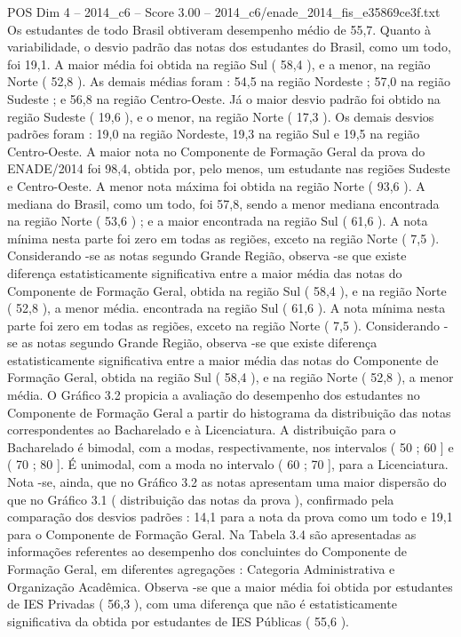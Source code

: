 \begin{textsample}{POS Dim 4 – 2014\_c6 – Score 3.00 – 2014\_c6/enade\_2014\_fis\_e35869ce3f.txt}
Os estudantes de todo Brasil obtiveram desempenho médio de 55,7.
Quanto à variabilidade, o desvio padrão das notas dos estudantes do Brasil, como um todo, foi 19,1.
A maior média foi obtida na região Sul ( 58,4 ), e a menor, na região Norte ( 52,8 ).
As demais médias foram : 54,5 na região Nordeste ; 57,0 na região Sudeste ; e 56,8 na região Centro-Oeste.
Já o maior desvio padrão foi obtido na região Sudeste ( 19,6 ), e o menor, na região Norte ( 17,3 ).
Os demais desvios padrões foram : 19,0 na região Nordeste, 19,3 na região Sul e 19,5 na região Centro-Oeste.
A maior nota no Componente de Formação Geral da prova do ENADE/2014 foi 98,4, obtida por, pelo menos, um estudante nas regiões Sudeste e Centro-Oeste.
A menor nota máxima foi obtida na região Norte ( 93,6 ).
A mediana do Brasil, como um todo, foi 57,8, sendo a menor mediana encontrada na região Norte ( 53,6 ) ; e a maior encontrada na região Sul ( 61,6 ).
A nota mínima nesta parte foi zero em todas as regiões, exceto na região Norte ( 7,5 ).
Considerando -se as notas segundo Grande Região, observa -se que existe diferença estatisticamente significativa entre a maior média das notas do Componente de Formação Geral, obtida na região Sul ( 58,4 ), e na região Norte ( 52,8 ), a menor média. encontrada na região Sul ( 61,6 ).
A nota mínima nesta parte foi zero em todas as regiões, exceto na região Norte ( 7,5 ).
Considerando -se as notas segundo Grande Região, observa -se que existe diferença estatisticamente significativa entre a maior média das notas do Componente de Formação Geral, obtida na região Sul ( 58,4 ), e na região Norte ( 52,8 ), a menor média.
O Gráfico 3.2 propicia a avaliação do desempenho dos estudantes no Componente de Formação Geral a partir do histograma da distribuição das notas correspondentes ao Bacharelado e à Licenciatura.
A distribuição para o Bacharelado é bimodal, com a modas, respectivamente, nos intervalos ( 50 ; 60 ] e ( 70 ; 80 ].
É unimodal, com a moda no intervalo ( 60 ; 70 ], para a Licenciatura.
Nota -se, ainda, que no Gráfico 3.2 as notas apresentam uma maior dispersão do que no Gráfico 3.1 ( distribuição das notas da prova ), confirmado pela comparação dos desvios padrões : 14,1 para a nota da prova como um todo e 19,1 para o Componente de Formação Geral.
Na Tabela 3.4 são apresentadas as informações referentes ao desempenho dos concluintes do Componente de Formação Geral, em diferentes agregações : Categoria Administrativa e Organização Acadêmica.
Observa -se que a maior média foi obtida por estudantes de IES Privadas ( 56,3 ), com uma diferença que não é estatisticamente significativa da obtida por estudantes de IES Públicas ( 55,6 ).

\end{textsample}
